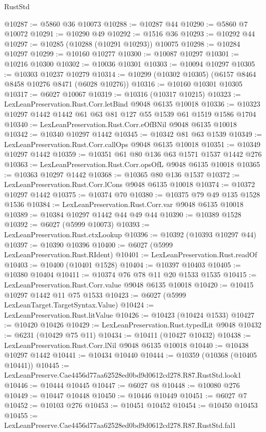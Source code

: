 \begin{lexlean}{RustStd}
\begin{coremodule}
{{@10287 := @5860 @36 @10073
@10288 := @10287 @44
@10290 := @5860 @7 @10072
@10291 := @10290 @49
@10292 := @1516 @36
@10293 := @10292 @44
@10297 := @10285 (@10288 (@10291 @10293)) @10075
@10298 := @10284 @10297
@10299 := @10160 @10277
@10300 := @10087 @10297
@10301 := @10216 @10300
@10302 := @10036 @10301
@10303 := @10094 @10297
@10305 := @10303 @10237 @10279
@10314 := @10299 (@10302 @10305) (@6157 @8464 @8458 @10276 @8471 (@6028 @10276))
@10316 := @10160 @10301 @10305
@10317 := @6027 @10067
@10319 := @10316 (@10317 @10215)
@10323 := LexLeanPreservation.Rust.Corr.letBind @9048 @6135 @10018
@10336 := @10323 @10297 @1442 @1442 @61 @63 @81 @127 @55 @1539 @61 @1519 @1586 @1704
@10340 := LexLeanPreservation.Rust.Corr.eOfBNil @9048 @6135 @10018
@10342 := @10340 @10297 @1442
@10345 := @10342 @81 @63 @1539
@10349 := LexLeanPreservation.Rust.Corr.callOps @9048 @6135 @10018
@10351 := @10349 @10297 @1442
@10359 := @10351 @61 @80 @136 @63 @1571 @1537 @1442 @276
@10363 := LexLeanPreservation.Rust.Corr.opsOfL @9048 @6135 @10018
@10365 := @10363 @10297 @1442
@10368 := @10365 @80 @136 @1537
@10372 := LexLeanPreservation.Rust.Corr.lCons @9048 @6135 @10018
@10374 := @10372 @10297 @1442
@10375 := @10374 @70
@10380 := @10375 @79 @49 @135 @1528 @1536
@10384 := LexLeanPreservation.Rust.Corr.var @9048 @6135 @10018
@10389 := @10384 @10297 @1442 @44 @49 @44
@10390 := @10389 @1528
@10392 := @6027 (@5999 @10073)
@10393 := LexLeanPreservation.Rust.ctxLookup
@10396 := @10392 (@10393 @10297 @44)
@10397 := @10390 @10396
@10400 := @6027 (@5999 LexLeanPreservation.Rust.RIdent)
@10401 := LexLeanPreservation.Rust.readOf
@10403 := @10400 (@10401 @1528)
@10404 := @10397 @10403
@10405 := @10380 @10404
@10411 := @10374 @76 @78 @11 @20 @1533 @1535
@10415 := LexLeanPreservation.Rust.Corr.value @9048 @6135 @10018
@10420 := @10415 @10297 @1442 @11 @75 @1533
@10423 := @6027 (@5999 LexLeanTarget.TargetSyntax.Value)
@10424 := LexLeanPreservation.Rust.litValue
@10426 := @10423 (@10424 @1533)
@10427 := @10420 @10426
@10429 := LexLeanPreservation.Rust.typedLit @9048
@10432 := @6231 (@10429 @75 @11)
@10434 := @10411 (@10427 @10432)
@10438 := LexLeanPreservation.Rust.Corr.lNil @9048 @6135 @10018
@10440 := @10438 @10297 @1442
@10441 := @10434 @10440
@10444 := @10359 (@10368 (@10405 @10441))
@10445 := LexLeanPreserve.Cae4456d77aa62528ed0bd9d0612cd278.R87.RustStd.look1
@10446 := @10444 @10445
@10447 := @6027 @8
@10448 := @10080 @276
@10449 := @10447 @10448
@10450 := @10446 @10449
@10451 := @6027 @7
@10452 := @10103 @276
@10453 := @10451 @10452
@10454 := @10450 @10453
@10455 := LexLeanPreserve.Cae4456d77aa62528ed0bd9d0612cd278.R87.RustStd.fal1
}}
\end{coremodule}
\end{lexlean}
